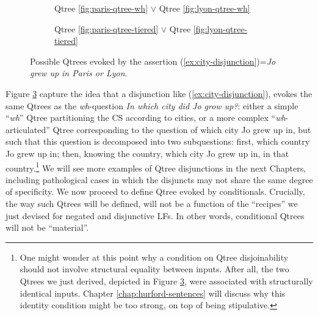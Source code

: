 \begin{figure}[H]
	\centering
	\begin{subfigure}[t]{.45\linewidth}
		\centering
		\caption{Qtree \ref{fig:paris-qtree-wh} $\vee$ Qtree \ref{fig:lyon-qtree-wh}}\label{fig:paris-or-lyon-qtree-wh}
	\end{subfigure}
	\hfill
	\begin{subfigure}[t]{.45\linewidth}
		\centering{}
		\caption{Qtree \ref{fig:paris-qtree-tiered} $\vee$ Qtree \ref{fig:lyon-qtree-tiered}}\label{fig:paris-or-lyon-qtree-tiered}
	\end{subfigure}
	\caption{Possible Qtrees evoked by the assertion (\ref{ex:city-disjunction})=\textit{Jo grew up in Paris or Lyon}.}\label{fig:paris-or-lyon-qtrees}
\end{figure}

Figure \ref{fig:paris-or-lyon-qtrees} capture the idea that a disjunction like (\ref{ex:city-disjunction}), evokes the same Qtrees as the \textit{wh}-question \textit{In which city did Jo grow up?}: either a simple ``\textit{wh}'' Qtree partitioning the CS according to cities, or a more complex ``\textit{wh}-articulated'' Qtree corresponding to the question of which city Jo grew up in, but such that this question is decomposed into two subquestions: first, which country Jo grew up in; then, knowing the country, which city Jo grew up in, in that country.\footnote{One might wonder at this point why a condition on Qtree disjoinability should not involve structural equality between inputs. After all, the two Qtrees we just derived, depicted in Figure \ref{fig:paris-or-lyon-qtrees}, were associated with structurally identical inputs. Chapter \ref{chap:hurford-sentences} will discuss why this identity condition might be too strong, on top of being stipulative.} We will see more examples of Qtree disjunctions in the next Chapters, including pathological cases in which the disjuncts may not share the same degree of specificity. We now proceed to define Qtree evoked by conditionals. Crucially, the way such Qtrees will be defined, will not be a function of the ``recipes'' we just devised for negated and disjunctive LFs. In other words, conditional Qtrees will not be ``material''.


